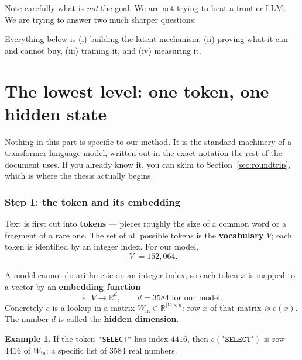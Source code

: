 \documentclass[11pt]{article}
\theoremstyle{definition}
\newtheorem{example}[theorem]{Example}
\begin{document}
Note carefully what is \emph{not} the goal. We are not trying to beat a frontier LLM. We are trying to answer two much sharper questions:

\begin{center}
\end{center}

Everything below is (i) building the latent mechanism, (ii) proving what it can and cannot buy, (iii) training it, and (iv) measuring it.

\newpage
\part{The lowest level: one token, one hidden state}
\label{part:token}

Nothing in this part is specific to our method. It is the standard machinery of a transformer language model, written out in the exact notation the rest of the document uses. If you already know it, you can skim to Section~\ref{sec:roundtrip}, which is where the thesis actually begins.

\section{Step 1: the token and its embedding}

Text is first cut into \textbf{tokens} --- pieces roughly the size of a common word or a fragment of a rare one. The set of all possible tokens is the \textbf{vocabulary} $V$; each token is identified by an integer index. For our model,
\[
|V| = 152{,}064.
\]

A model cannot do arithmetic on an integer index, so each token $x$ is mapped to a vector by an \textbf{embedding function}
\[
e:\ V \to \mathbb{R}^{d}, \qquad d = 3584 \text{ for our model}.
\]
Concretely $e$ is a lookup in a matrix $W_{\mathrm{in}} \in \mathbb{R}^{|V|\times d}$: row $x$ of that matrix \emph{is} $e(x)$. The number $d$ is called the \textbf{hidden dimension}.

\begin{example}
If the token \texttt{"SELECT"} has index $4416$, then $e(\texttt{"SELECT"})$ is row $4416$ of $W_{\mathrm{in}}$: a specific list of $3584$ real numbers.
\end{example}
\end{document}
